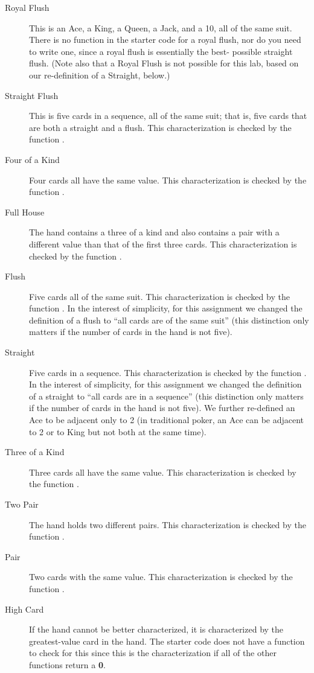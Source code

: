 \begin{description}
\item[Royal Flush] This is an Ace, a King, a Queen, a Jack, and a 10, all of
    the same suit. There is no function in the starter code for a royal flush,
    nor do you need to write one, since a royal flush is essentially the best-
    possible straight flush. (Note also that a Royal Flush is not possible for
    this lab, based on our re-definition of a Straight, below.)
\item[Straight Flush] This is five cards in a sequence, all of the same suit;
    that is, five cards that are both a straight and a flush. This
    characterization is checked by the function .
\item[Four of a Kind] Four cards all have the same value. This
    characterization is checked by the function .
\item[Full House] The hand contains a three of a kind and also contains a pair
    with a different value than that of the first three cards. This
    characterization is checked by the function .
\item[Flush] Five cards all of the same suit. This characterization is checked
    by the function . In the interest of simplicity, for
    this assignment we changed the definition of a flush to ``all cards are of
    the same suit'' (this distinction only matters if the number of cards in
    the hand is not five).
\item[Straight] Five cards in a sequence. This characterization is checked by
    the function . In the interest of simplicity, for
    this assignment we changed the definition of a straight to ``all cards are
    in a sequence'' (this distinction only matters if the number of cards in
    the hand is not five). We further re-defined an Ace to be adjacent only to
    2 (in traditional poker, an Ace can be adjacent to 2 or to King but not
    both at the same time).
\item[Three of a Kind] Three cards all have the same value. This
    characterization is checked by the function .
\item[Two Pair] The hand holds two different pairs. This characterization is
    checked by the function .
\item[Pair] Two cards with the same value. This characterization is checked by
    the function .
\item[High Card] If the hand cannot be better characterized, it is
    characterized by the greatest-value card in the hand. The starter code
    does not have a function to check for this since this is the
    characterization if all of the other functions return a \textbf{0}.
\end{description}

